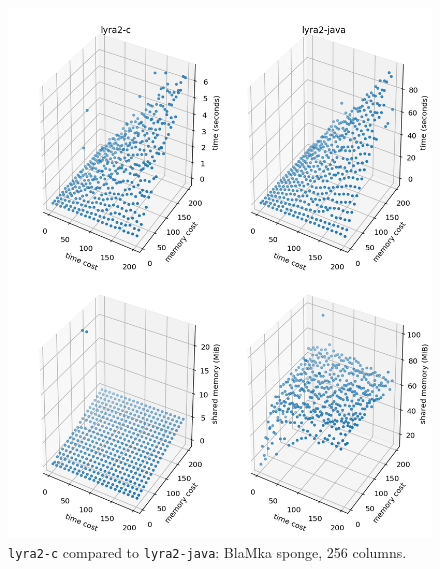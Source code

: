\begin{figure}[H]
    \centering
    \includegraphics[width=\linewidth]{figures/tcost_mcost_blamka_256}
    \caption{\texttt{lyra2-c} compared to \texttt{lyra2-java}: BlaMka sponge, 256 columns. }
    \label{figure:tcost_mcost_blamka_256}
\end{figure}

